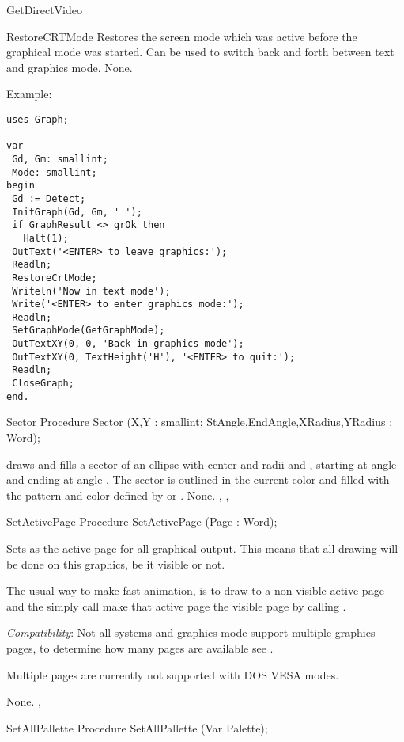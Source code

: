 \begin{function}{GetDirectVideo}
\begin{procedure}{RestoreCRTMode}
\Description
Restores the screen mode which was active before
the graphical mode was started. Can be used to switch back and forth
between text and graphics mode.
\Errors
None.
\SeeAlso
{}


\end{procedure}

Example:
\begin{verbatim}
uses Graph;

var
 Gd, Gm: smallint;
 Mode: smallint;
begin
 Gd := Detect;
 InitGraph(Gd, Gm, ' ');
 if GraphResult <> grOk then
   Halt(1);
 OutText('<ENTER> to leave graphics:');
 Readln;
 RestoreCrtMode;
 Writeln('Now in text mode');
 Write('<ENTER> to enter graphics mode:');
 Readln;
 SetGraphMode(GetGraphMode);
 OutTextXY(0, 0, 'Back in graphics mode');
 OutTextXY(0, TextHeight('H'), '<ENTER> to quit:');
 Readln;
 CloseGraph;
end.
\end{verbatim}
\begin{procedure}{Sector}
\Declaration
Procedure Sector (X,Y : smallint; StAngle,EndAngle,XRadius,YRadius : Word);

\Description
{}
draws and fills a sector of an ellipse  with center  and radii
 and , starting at angle  and ending at angle
. The sector is outlined in the current color and filled with
the pattern and color defined by  or .
\Errors
None.
\SeeAlso
{}, , 
\end{procedure}
\begin{procedure}{SetActivePage}
\Declaration
Procedure SetActivePage (Page : Word);

\Description
Sets  as the active page
for all graphical output. This means that all drawing will be done on this
graphics, be it visible or not.

The usual way to make fast animation, is to draw to a non visible active page
and the simply call make that active page the visible page by calling
.

\textit{Compatibility}:
Not all systems and graphics mode support multiple graphics pages, to
determine how many pages are available see .

Multiple pages are currently not supported with DOS VESA modes.

\Errors
None.
\SeeAlso
{}, 

\end{procedure}
\begin{procedure}{SetAllPallette}
\Declaration
Procedure SetAllPallette (Var Palette);


\end{procedure}
\end{function}
